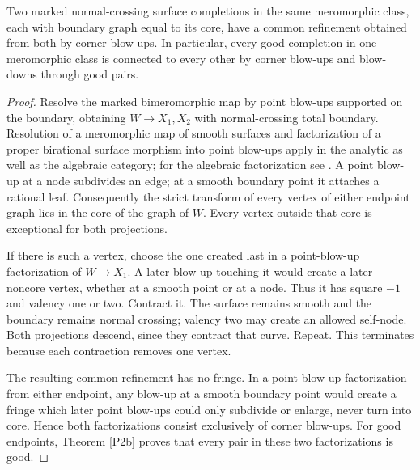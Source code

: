 \begin{theorem}\label{P3a-core}
Two marked normal-crossing surface completions in the same
meromorphic class, each with boundary graph equal to its core,
have a common refinement obtained from both by corner blow-ups.
In particular, every good completion in one meromorphic class
is connected to every other by corner blow-ups and blow-downs
through good pairs.
\end{theorem}
\begin{proof}
Resolve the marked bimeromorphic map by point blow-ups supported
on the boundary, obtaining $W\to X_1,X_2$ with normal-crossing
total boundary. Resolution of a meromorphic map of smooth
surfaces and factorization of a proper birational surface
morphism into point blow-ups apply in the analytic as well as
the algebraic category; for the algebraic factorization see
\citet[Tag 0C5Q, Lemma 54.17.1]{StacksSurfaceFactorization2026}.
A point blow-up at a node subdivides an edge; at a smooth
boundary point it attaches a rational leaf. Consequently the
strict transform of every vertex of either endpoint graph lies
in the core of the graph of $W$. Every vertex outside that core
is exceptional for both projections.

If there is such a vertex, choose the one created last in a
point-blow-up factorization of $W\to X_1$. A later blow-up touching
it would create a later noncore vertex, whether at a smooth point
or at a node. Thus it has square $-1$ and valency one or two.
Contract it. The surface remains smooth and the boundary remains
normal crossing; valency two may create an allowed self-node.
Both projections descend, since they contract that curve. Repeat.
This terminates because each contraction removes one vertex.

The resulting common refinement has no fringe. In a point-blow-up
factorization from either endpoint, any blow-up at a smooth
boundary point would create a fringe which later point blow-ups
could only subdivide or enlarge, never turn into core. Hence
both factorizations consist exclusively of corner blow-ups.
For good endpoints, Theorem \ref{P2b} proves that every pair in
these two factorizations is good.
\end{proof}

